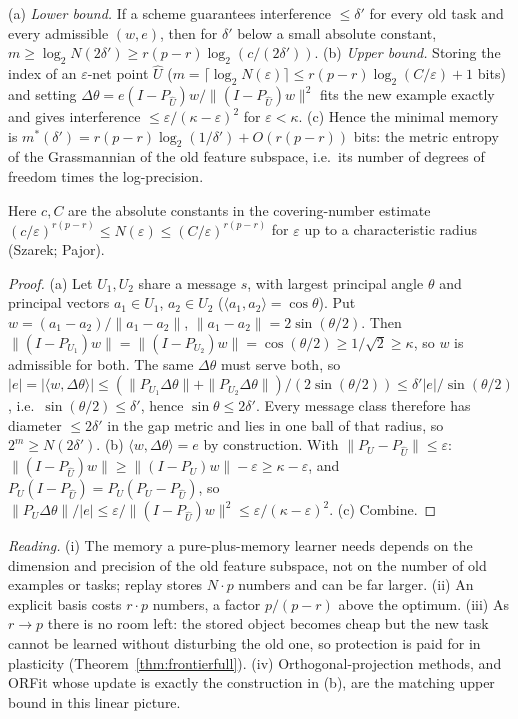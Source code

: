 \begin{theorem}\label{thm:minmem}
(a) \emph{Lower bound.} If a scheme guarantees interference $\le\delta'$ for every old task and every admissible $(w,e)$, then for $\delta'$ below a small absolute constant, $m\ge\log_2N(2\delta')\ge r(p-r)\log_2(c/(2\delta'))$. (b) \emph{Upper bound.} Storing the index of an $\varepsilon$-net point $\hat U$ ($m=\lceil\log_2N(\varepsilon)\rceil\le r(p-r)\log_2(C/\varepsilon)+1$ bits) and setting $\Delta\theta=e(I-P_{\hat U})w/\|(I-P_{\hat U})w\|^2$ fits the new example exactly and gives interference $\le\varepsilon/(\kappa-\varepsilon)^2$ for $\varepsilon<\kappa$. (c) Hence the minimal memory is $m^\ast(\delta')=r(p-r)\log_2(1/\delta')+O(r(p-r))$ bits: the metric entropy of the Grassmannian of the old feature subspace, i.e.\ its number of degrees of freedom times the log-precision.
\end{theorem}
Here $c,C$ are the absolute constants in the covering-number estimate $(c/\varepsilon)^{r(p-r)}\le N(\varepsilon)\le(C/\varepsilon)^{r(p-r)}$ for $\varepsilon$ up to a characteristic radius (Szarek; Pajor).
\begin{proof}
(a) Let $U_1,U_2$ share a message $s$, with largest principal angle $\theta$ and principal vectors $a_1\in U_1$, $a_2\in U_2$ ($\langle a_1,a_2\rangle=\cos\theta$). Put $w=(a_1-a_2)/\|a_1-a_2\|$, $\|a_1-a_2\|=2\sin(\theta/2)$. Then $\|(I-P_{U_1})w\|=\|(I-P_{U_2})w\|=\cos(\theta/2)\ge1/\sqrt2\ge\kappa$, so $w$ is admissible for both. The same $\Delta\theta$ must serve both, so $|e|=|\langle w,\Delta\theta\rangle|\le(\|P_{U_1}\Delta\theta\|+\|P_{U_2}\Delta\theta\|)/(2\sin(\theta/2))\le\delta'|e|/\sin(\theta/2)$, i.e.\ $\sin(\theta/2)\le\delta'$, hence $\sin\theta\le2\delta'$. Every message class therefore has diameter $\le2\delta'$ in the gap metric and lies in one ball of that radius, so $2^m\ge N(2\delta')$. (b) $\langle w,\Delta\theta\rangle=e$ by construction. With $\|P_U-P_{\hat U}\|\le\varepsilon$: $\|(I-P_{\hat U})w\|\ge\|(I-P_U)w\|-\varepsilon\ge\kappa-\varepsilon$, and $P_U(I-P_{\hat U})=P_U(P_U-P_{\hat U})$, so $\|P_U\Delta\theta\|/|e|\le\varepsilon/\|(I-P_{\hat U})w\|^2\le\varepsilon/(\kappa-\varepsilon)^2$. (c) Combine.
\end{proof}
\emph{Reading.} (i) The memory a pure-plus-memory learner needs depends on the dimension and precision of the old feature subspace, not on the number of old examples or tasks; replay stores $N\cdot p$ numbers and can be far larger. (ii) An explicit basis costs $r\cdot p$ numbers, a factor $p/(p-r)$ above the optimum. (iii) As $r\to p$ there is no room left: the stored object becomes cheap but the new task cannot be learned without disturbing the old one, so protection is paid for in plasticity (Theorem~\ref{thm:frontierfull}). (iv) Orthogonal-projection methods, and ORFit whose update is exactly the construction in (b), are the matching upper bound in this linear picture.

